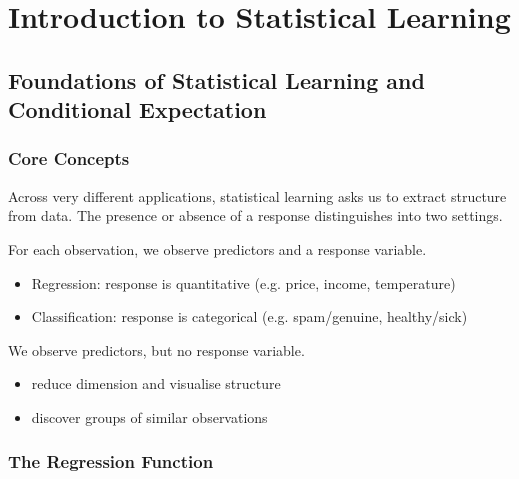 \providecommand{\E}{\operatorname{E}}
\providecommand{\Var}{\operatorname{Var}}
\providecommand{\fhat}{\hat{f}}
\providecommand{\data}{\mathcal{D}}
\providecommand{\Bias}{\operatorname{Bias}}



\chapter{Introduction to Statistical Learning}
\label{ch:topic1}

\section{Foundations of Statistical Learning and Conditional Expectation}

\subsection{Core Concepts}
Across very different applications, statistical learning asks us to extract structure from data. The presence or absence of a response distinguishes into two settings.

\begin{definition}
    For each observation, we observe predictors and a response variable.
    \begin{itemize}
        \item Regression: response is quantitative (e.g. price, income, temperature)
        \item Classification: response is categorical (e.g. spam/genuine, healthy/sick)
    \end{itemize}
\end{definition}

\begin{definition}
    We observe predictors, but no response variable.
    \begin{itemize}
        \item reduce dimension and visualise structure
        \item discover groups of similar observations
    \end{itemize}
\end{definition}

\subsection{The Regression Function}


